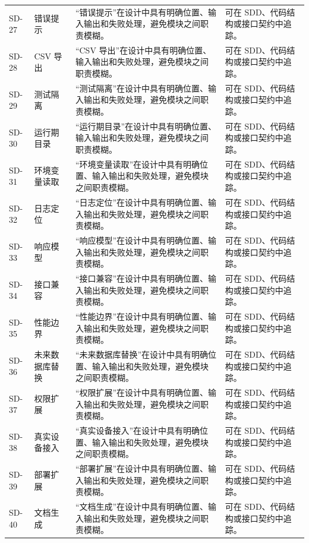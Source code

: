 \documentclass[12pt,a4paper]{ctexart}
\begin{document}
\begin{longtable}{L{1.7cm}L{3.2cm}L{6.4cm}L{4.0cm}}
SD-27 & 错误提示 & “错误提示”在设计中具有明确位置、输入输出和失败处理，避免模块之间职责模糊。 & 可在 SDD、代码结构或接口契约中追踪。 \\
SD-28 & CSV 导出 & “CSV 导出”在设计中具有明确位置、输入输出和失败处理，避免模块之间职责模糊。 & 可在 SDD、代码结构或接口契约中追踪。 \\
SD-29 & 测试隔离 & “测试隔离”在设计中具有明确位置、输入输出和失败处理，避免模块之间职责模糊。 & 可在 SDD、代码结构或接口契约中追踪。 \\
SD-30 & 运行期目录 & “运行期目录”在设计中具有明确位置、输入输出和失败处理，避免模块之间职责模糊。 & 可在 SDD、代码结构或接口契约中追踪。 \\
SD-31 & 环境变量读取 & “环境变量读取”在设计中具有明确位置、输入输出和失败处理，避免模块之间职责模糊。 & 可在 SDD、代码结构或接口契约中追踪。 \\
SD-32 & 日志定位 & “日志定位”在设计中具有明确位置、输入输出和失败处理，避免模块之间职责模糊。 & 可在 SDD、代码结构或接口契约中追踪。 \\
SD-33 & 响应模型 & “响应模型”在设计中具有明确位置、输入输出和失败处理，避免模块之间职责模糊。 & 可在 SDD、代码结构或接口契约中追踪。 \\
SD-34 & 接口兼容 & “接口兼容”在设计中具有明确位置、输入输出和失败处理，避免模块之间职责模糊。 & 可在 SDD、代码结构或接口契约中追踪。 \\
SD-35 & 性能边界 & “性能边界”在设计中具有明确位置、输入输出和失败处理，避免模块之间职责模糊。 & 可在 SDD、代码结构或接口契约中追踪。 \\
SD-36 & 未来数据库替换 & “未来数据库替换”在设计中具有明确位置、输入输出和失败处理，避免模块之间职责模糊。 & 可在 SDD、代码结构或接口契约中追踪。 \\
SD-37 & 权限扩展 & “权限扩展”在设计中具有明确位置、输入输出和失败处理，避免模块之间职责模糊。 & 可在 SDD、代码结构或接口契约中追踪。 \\
SD-38 & 真实设备接入 & “真实设备接入”在设计中具有明确位置、输入输出和失败处理，避免模块之间职责模糊。 & 可在 SDD、代码结构或接口契约中追踪。 \\
SD-39 & 部署扩展 & “部署扩展”在设计中具有明确位置、输入输出和失败处理，避免模块之间职责模糊。 & 可在 SDD、代码结构或接口契约中追踪。 \\
SD-40 & 文档生成 & “文档生成”在设计中具有明确位置、输入输出和失败处理，避免模块之间职责模糊。 & 可在 SDD、代码结构或接口契约中追踪。 \\
\bottomrule
\end{longtable}
\end{document}
